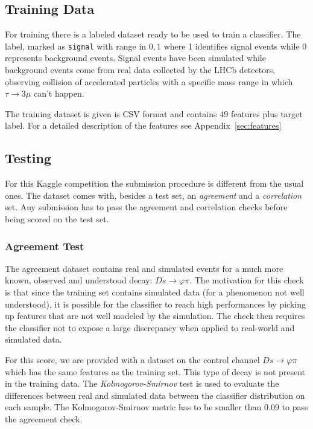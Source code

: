 \documentclass[conference]{IEEEtran}
\begin{document}
\subsection{Training Data}
For training there is a labeled dataset ready to be used to train a classifier.
The label, marked as \texttt{signal} with range in ${0,1}$ where 1 identifies
signal events while 0 represents background events. Signal events have been
simulated while background events come from real data collected by the LHCb
detectors, observing collision of accelerated particles with a specific mass
range in which $\tau \rightarrow 3\mu$ can't happen.

The training dataset is given is CSV format and contains 49 features plus target
label. For a detailed description of the features see
Appendix~\ref{sec:features}

\subsection{Testing}
For this Kaggle competition the submission procedure is different from the usual
ones. The dataset comes with, besides a test set, an \textit{agreement} and a
\textit{correlation} set. Any submission has to pass the agreement and
correlation checks before being scored on the test set.

\subsubsection{Agreement Test}
\label{sec:agreement}
The agreement dataset contains real and simulated events for a much more known,
observed and understood decay: $Ds \rightarrow \varphi\pi$. The motivation for
this check is that since the training set contains simulated data (for a
phenomenon not well understood), it is possible for the classifier to reach high
performances by picking up features that are not well modeled by the simulation.
The check then requires the classifier not to expose a large discrepancy when
applied to real-world and simulated data.

For this score, we are provided with a dataset on the control channel $Ds
\rightarrow \varphi\pi$ which has the same features as the training set. This
type of decay is not present in the training data. The
\textit{Kolmogorov-Smirnov} test is used to evaluate the differences between
real and simulated data between the classifier distribution on each sample.
The Kolmogorov-Smirnov metric has to be smaller than 0.09 to pass the agreement
check.
\end{document}
